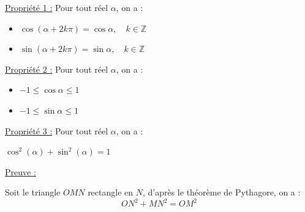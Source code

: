 \documentclass[12pt,a4paper]{article}
\begin{document}
\noindent \textcolor{monRouge}{\underline{Propriété 1 :}} Pour tout réel $\alpha$, on a :
\begin{itemize}
    \item[i)] $\cos(\alpha + 2k\pi) = \cos \alpha, \quad k \in \mathbb{Z}$
    \item[ii)] $\sin(\alpha + 2k\pi) = \sin \alpha, \quad k \in \mathbb{Z}$
\end{itemize}

\noindent \textcolor{monRouge}{\underline{Propriété 2 :}} Pour tout réel $\alpha$, on a :
\begin{itemize}
    \item[i)] $-1 \le \cos \alpha \le 1$
    \item[ii)] $-1 \le \sin \alpha \le 1$
\end{itemize}

\vspace{1.5em}

\noindent \textcolor{monRouge}{\underline{Propriété 3 :}} Pour tout réel $\alpha$, on a :
\begin{center}
    $\cos^2(\alpha) + \sin^2(\alpha) = 1$
\end{center}


\noindent \textcolor{monRouge}{\underline{Preuve :}}

\begin{center}
\end{center}

\noindent Soit le triangle $OMN$ rectangle en $N$, d'après le théorème de Pythagore, on a :
\[ ON^2 + MN^2 = OM^2 \]
\end{document}

